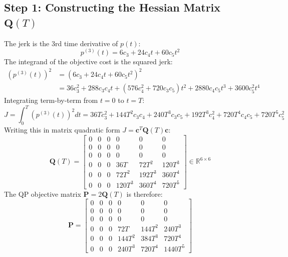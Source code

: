 \documentclass[11pt,a4paper]{article}
\begin{document}
\subsection{Step 1: Constructing the Hessian Matrix \texorpdfstring{$\mathbf{Q}(T)$}{Q(T)}}

The jerk is the 3rd time derivative of $p(t)$:
\begin{equation}
p^{(3)}(t) = 6 c_3 + 24 c_4 t + 60 c_5 t^2
\end{equation}
The integrand of the objective cost is the squared jerk:
\begin{align}
\left( p^{(3)}(t) \right)^2 &= \left( 6 c_3 + 24 c_4 t + 60 c_5 t^2 \right)^2 \nonumber \\
&= 36 c_3^2 + 288 c_3 c_4 t + \left( 576 c_4^2 + 720 c_3 c_5 \right) t^2 + 2880 c_4 c_5 t^3 + 3600 c_5^2 t^4
\end{align}
Integrating term-by-term from $t=0$ to $t=T$:
\begin{equation}
J = \int_0^T \left( p^{(3)}(t) \right)^2 dt
= 36 T c_3^2 + 144 T^2 c_3 c_4 + 240 T^3 c_3 c_5 + 192 T^3 c_4^2 + 720 T^4 c_4 c_5 + 720 T^5 c_5^2
\end{equation}
Writing this in matrix quadratic form $J = \mathbf{c}^T \mathbf{Q}(T) \mathbf{c}$:
\begin{equation}
\label{eq:Q_quintic_symbolic}
\mathbf{Q}(T) = \begin{bmatrix}
0 & 0 & 0 & 0 & 0 & 0 \\
0 & 0 & 0 & 0 & 0 & 0 \\
0 & 0 & 0 & 0 & 0 & 0 \\
0 & 0 & 0 & 36 T & 72 T^2 & 120 T^3 \\
0 & 0 & 0 & 72 T^2 & 192 T^3 & 360 T^4 \\
0 & 0 & 0 & 120 T^3 & 360 T^4 & 720 T^5
\end{bmatrix} \in \mathbb{R}^{6 \times 6}
\end{equation}
The QP objective matrix $\mathbf{P} = 2 \mathbf{Q}(T)$ is therefore:
\begin{equation}
\label{eq:P_quintic_symbolic}
\mathbf{P} = \begin{bmatrix}
0 & 0 & 0 & 0 & 0 & 0 \\
0 & 0 & 0 & 0 & 0 & 0 \\
0 & 0 & 0 & 0 & 0 & 0 \\
0 & 0 & 0 & 72 T & 144 T^2 & 240 T^3 \\
0 & 0 & 0 & 144 T^2 & 384 T^3 & 720 T^4 \\
0 & 0 & 0 & 240 T^3 & 720 T^4 & 1440 T^5
\end{bmatrix}
\end{equation}
\end{document}
